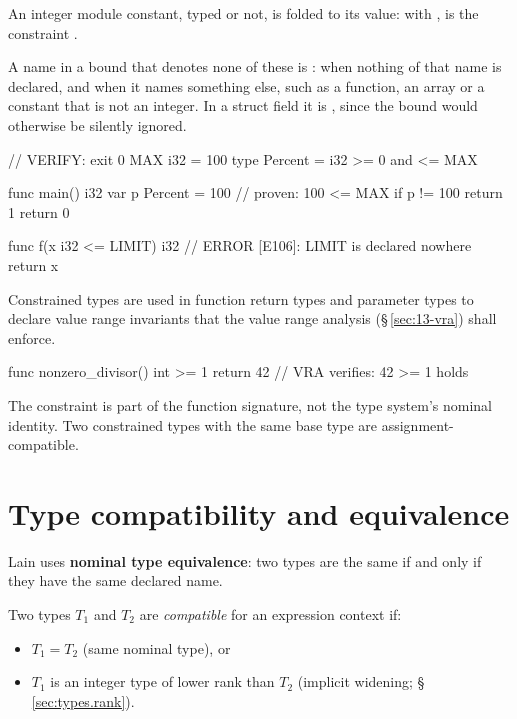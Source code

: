\pnum
An integer module constant, typed or not, is folded to its value: with ,
 is the constraint .

\begin{constraint}
  A name in a bound that denotes none of these is \illformed{}:  when nothing of
  that name is declared, and  when it names something else, such as a function,
  an array or a constant that is not an integer.  In a struct field it is
  , since the bound would otherwise be silently ignored.
\end{constraint}

\begin{laincode}
// VERIFY: exit 0
MAX i32 = 100
type Percent = i32 >= 0 and <= MAX

func main() i32 {
    var p Percent = 100              // proven: 100 <= MAX
    if p != 100 { return 1 }
    return 0
}
\end{laincode}

\begin{laincode}
func f(x i32 <= LIMIT) i32 {         // ERROR [E106]: LIMIT is declared nowhere
    return x
}
\end{laincode}

\pnum
Constrained types are used in function return types and parameter types to
declare value range invariants that the value range analysis
(\S\,\ref{sec:13-vra}) shall enforce.

\begin{example}
\begin{laincode}
func nonzero_divisor() int >= 1 {
    return 42   // VRA verifies: 42 >= 1 holds
}
\end{laincode}
\end{example}

\pnum
The constraint is part of the function signature, not the type system's
nominal identity.  Two constrained types with the same base type are
assignment-compatible.

\section{Type compatibility and equivalence}
\label{sec:types.compat}

\pnum
Lain uses \textbf{nominal type equivalence}: two types are the same if and
only if they have the same declared name.

\pnum
Two types $T_1$ and $T_2$ are \textit{compatible} for an expression context
if:
\begin{itemize}
  \item $T_1 = T_2$ (same nominal type), or
  \item $T_1$ is an integer type of lower rank than $T_2$ (implicit
        widening; \S\,\ref{sec:types.rank}).
\end{itemize}

